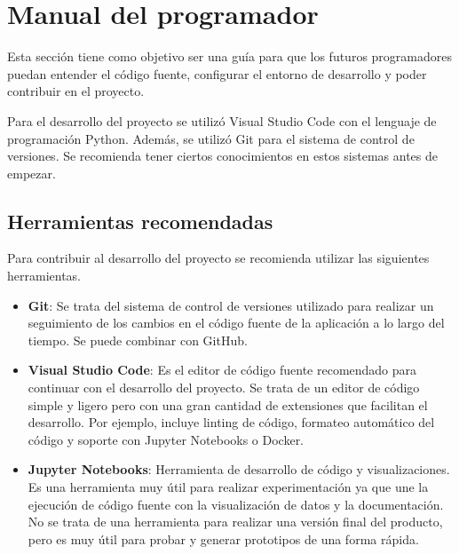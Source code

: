 \section{Manual del programador}

Esta sección tiene como objetivo ser una guía para que los futuros programadores puedan entender el código fuente, configurar el entorno de desarrollo y poder contribuir en el proyecto.

Para el desarrollo del proyecto se utilizó Visual Studio Code con el lenguaje de programación Python. Además, se utilizó Git para el sistema de control de versiones. Se recomienda tener ciertos conocimientos en estos sistemas antes de empezar.

\subsection{Herramientas recomendadas}

Para contribuir al desarrollo del proyecto se recomienda utilizar las siguientes herramientas.

\begin{itemize}
\tightlist

\item \textbf{Git}: Se trata del sistema de control de versiones utilizado para realizar un seguimiento de los cambios en el código fuente de la aplicación a lo largo del tiempo. Se puede combinar con GitHub.


\item \textbf{Visual Studio Code}: Es el editor de código fuente recomendado para continuar con el desarrollo del proyecto. Se trata de un editor de código simple y ligero pero con una gran cantidad de extensiones que facilitan el desarrollo.
Por ejemplo, incluye linting de código, formateo automático del código y soporte con Jupyter Notebooks o Docker.


\item \textbf{Jupyter Notebooks}: Herramienta de desarrollo de código y visualizaciones. Es una herramienta muy útil para realizar experimentación ya que une la ejecución de código fuente con la visualización de datos y la documentación.
No se trata de una herramienta para realizar una versión final del producto, pero es muy útil para probar y generar prototipos de una forma rápida.


\end{itemize}

